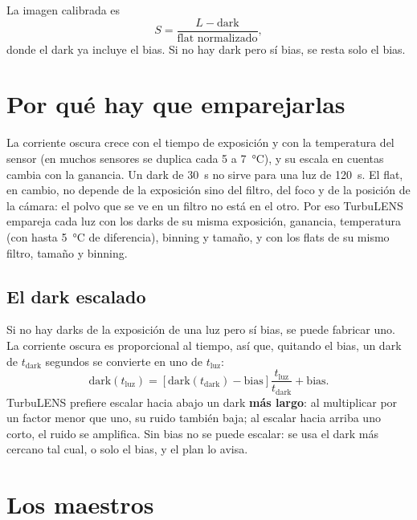La imagen calibrada es
\begin{equation}
S = \frac{L - \text{dark}}{\text{flat normalizado}} ,
\end{equation}
donde el dark ya incluye el bias. Si no hay dark pero sí bias, se resta solo el bias.

\section{Por qué hay que emparejarlas}

La corriente oscura crece con el tiempo de exposición y con la temperatura del sensor (en muchos sensores se duplica cada
5 a 7~°C), y su escala en cuentas cambia con la ganancia. Un dark de 30~s no sirve para una luz de 120~s. El flat, en
cambio, no depende de la exposición sino del filtro, del foco y de la posición de la cámara: el polvo que se ve en un
filtro no está en el otro. Por eso TurbuLENS empareja cada luz con los darks de su misma exposición, ganancia,
temperatura (con hasta 5~°C de diferencia), binning y tamaño, y con los flats de su mismo filtro, tamaño y binning.

\subsection{El dark escalado}\label{sec:dark_escalado}

Si no hay darks de la exposición de una luz pero sí bias, se puede fabricar uno. La corriente oscura es proporcional al
tiempo, así que, quitando el bias, un dark de $t_\text{dark}$ segundos se convierte en uno de $t_\text{luz}$:
\begin{equation}
\text{dark}(t_\text{luz}) = \left[\text{dark}(t_\text{dark}) - \text{bias}\right]\frac{t_\text{luz}}{t_\text{dark}}
+ \text{bias} .
\end{equation}
TurbuLENS prefiere escalar hacia abajo un dark \textbf{más largo}: al multiplicar por un factor menor que uno, su ruido
también baja; al escalar hacia arriba uno corto, el ruido se amplifica. Sin bias no se puede escalar: se usa el dark
más cercano tal cual, o solo el bias, y el plan lo avisa.

\section{Los maestros}

